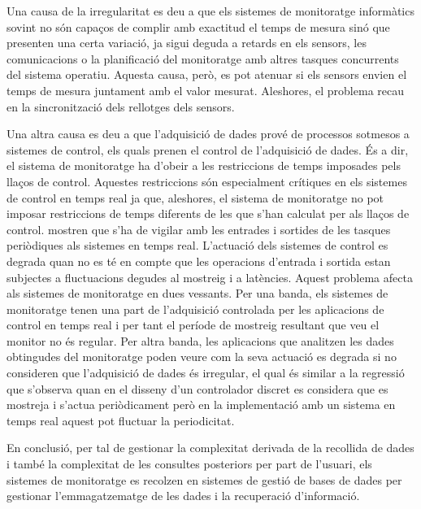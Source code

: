 \begin{enumerate}
Una causa de la irregularitat es deu a que els sistemes de monitoratge informàtics sovint no són capaços de complir amb exactitud el temps de mesura sinó que presenten una certa variació, ja sigui deguda a retards en els sensors, les comunicacions o la planificació del monitoratge amb altres tasques concurrents del sistema operatiu. Aquesta causa, però, es pot atenuar si els sensors envien el temps de mesura juntament amb el valor mesurat. Aleshores, el problema recau en la sincronització dels rellotges dels sensors.

Una altra causa es deu a que l'adquisició de dades prové de processos sotmesos a sistemes de control, els quals prenen el control de l'adquisició de dades. És a dir, el sistema de monitoratge ha d'obeir a les restriccions de temps imposades pels llaços de control. Aquestes restriccions són especialment crítiques en els sistemes de control en temps real ja que, aleshores, el sistema de monitoratge no pot imposar restriccions de temps diferents de les que s'han calculat per als llaços de control.  \textcite{lozoya08} mostren que s'ha de vigilar amb les entrades i sortides de les tasques periòdiques als sistemes en temps real. L'actuació dels sistemes de control es degrada quan no es té en compte que les operacions d'entrada i sortida estan subjectes a fluctuacions degudes al mostreig i a latències. Aquest problema afecta als sistemes de monitoratge en dues vessants.
Per una banda, els sistemes de monitoratge tenen una part de l'adquisició controlada per les aplicacions de control en temps real i per tant el període de mostreig resultant que veu el monitor no és regular. 
Per altra banda, les aplicacions que analitzen les dades obtingudes del monitoratge poden veure com la seva actuació es degrada si no consideren que l'adquisició de dades és irregular, el qual és similar a la regressió que s'observa \parencite{lozoya08} quan en el disseny d'un controlador discret es considera que es mostreja i s'actua periòdicament però en la implementació amb un sistema en temps real aquest pot fluctuar la periodicitat.

\end{enumerate}



En conclusió, per tal de gestionar la complexitat derivada de la recollida de dades i també la complexitat de les consultes posteriors per part de l'usuari, els sistemes de monitoratge es recolzen en sistemes de gestió de bases de dades per gestionar l'emmagatzematge de les dades i la recuperació d'informació.





